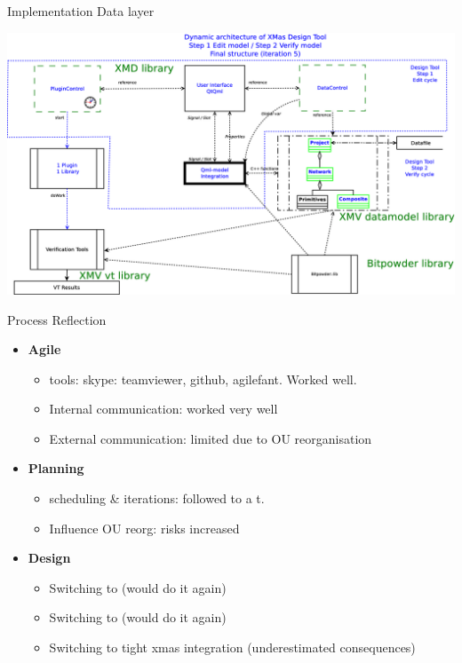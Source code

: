 \documentclass[11pt]{beamer}
\begin{document}
\begin{frame}{Implementation Data layer}

	\includegraphics[width=.90\linewidth]{pictures/1c-architecture-dynamic-2}

\end{frame}

\begin{frame}{Process Reflection}
	\begin{itemize}
		\item {\bf Agile} 
				\begin{itemize}
					\item tools: skype: teamviewer, github, agilefant. Worked well.
					\item Internal communication: worked very well
					\item External communication: limited due to OU reorganisation
				\end{itemize}
		\item {\bf Planning}
				\begin{itemize}
					\item scheduling \& iterations: followed to a t.
					\item Influence OU reorg: risks increased
				\end{itemize}
		\item {\bf Design} 
			\begin{itemize}
				\item Switching to \qt				 (would do it again)
				\item Switching to \qml				 (would do it again)
				\item Switching to tight xmas integration (underestimated consequences)
			\end{itemize}
	\end{itemize}
\end{frame}
\end{document}
